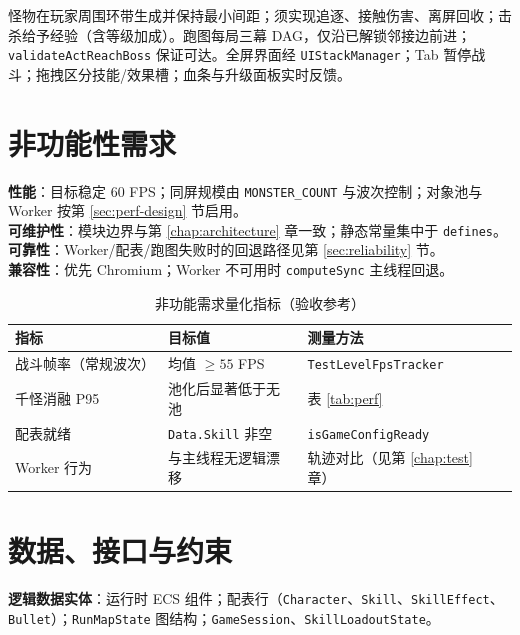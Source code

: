 \documentclass[UTF8,a4paper]{ctexart}
\begin{document}
怪物在玩家周围环带生成并保持最小间距；须实现追逐、接触伤害、离屏回收；击杀给予经验（含等级加成）。跑图每局三幕 DAG，仅沿已解锁邻接边前进；\texttt{validateActReachBoss} 保证可达。全屏界面经 \texttt{UIStackManager}；Tab 暂停战斗；拖拽区分技能/效果槽；血条与升级面板实时反馈\cite{heijstek2011empirical}。

\section{非功能性需求}

\textbf{性能}：目标稳定 60 FPS；同屏规模由 \texttt{MONSTER\_COUNT} 与波次控制；对象池与 Worker 按第 \ref{sec:perf-design} 节启用。\\
\textbf{可维护性}：模块边界与第 \ref{chap:architecture} 章一致；静态常量集中于 \texttt{defines}。\\
\textbf{可靠性}：Worker/配表/跑图失败时的回退路径见第 \ref{sec:reliability} 节。\\
\textbf{兼容性}：优先 Chromium；Worker 不可用时 \texttt{computeSync} 主线程回退\cite{cantrell2018unity}。

\begin{table}[htbp]
  
  \caption{非功能需求量化指标（验收参考）}
  \label{tab:nfr-metrics}
  \begin{tabular}{lll}
    \toprule
    \textbf{指标} & \textbf{目标值} & \textbf{测量方法} \\
    \midrule
    战斗帧率（常规波次） & 均值 $\geq 55$ FPS & \texttt{TestLevelFpsTracker} \\
    千怪消融 P95 & 池化后显著低于无池 & 表 \ref{tab:perf} \\
    配表就绪 & \texttt{Data.Skill} 非空 & \texttt{isGameConfigReady} \\
    Worker 行为 & 与主线程无逻辑漂移 & 轨迹对比（见第 \ref{chap:test} 章） \\
    \bottomrule
  \end{tabular}
\end{table}

\section{数据、接口与约束}

\textbf{逻辑数据实体}：运行时 ECS 组件；配表行（\texttt{Character}、\texttt{Skill}、\texttt{SkillEffect}、\texttt{Bullet}）；\texttt{RunMapState} 图结构；\texttt{GameSession}、\texttt{SkillLoadoutState}。
\end{document}
